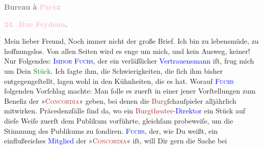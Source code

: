            \pstart
           \begin{otherlanguage}{french}\textcolor{gray}{\textbf{\textbf{Bureau à \textcolor{pink}{Paris}{}\ledrightnote{\textcolor{pink}{Paris}}:}}}\end{otherlanguage}\pend
           \pstart
           \begin{otherlanguage}{french}\textcolor{gray}{\textbf{\textbf{\textcolor{pink}{24. Rue Feydeau}{}\ledrightnote{\textcolor{pink}{rue Feydeau}}.}}}\end{otherlanguage}\pend
           \pstart\center{}Mein lieber Freund,\pend\pstart
           Noch immer nicht der große Brief. Ich bin zu lebensmüde, zu hoffnungslos. Von allen
               Seiten wird es enge um mich, und kein Ausweg, keiner!\pend
           \pstart
           Nur Folgendes: \textsc{\textcolor{blue}{Isidor Fuchs}{}\ledrightnote{\textcolor{blue}{Isidor Fuchs}}}, der ein verläßlicher \textcolor{blue}{Vertrauensmann}{} iſt, frug mich um Dein \textcolor{green}{Stück}{}. Ich ſagte ihm, die Schwierig{\pb}keiten, die ſich ihm bisher entgegengeſtellt, lagen
               wohl in den Kühnheiten, die es hat. Worauf \textsc{\textcolor{blue}{Fuchs}{}\ledrightnote{\textcolor{blue}{Isidor Fuchs}}} ſolgenden Vorſchlag machte: Man ſolle es zuerſt in einer jener Vorſtellungen
               zum Benefiz der »\textsc{\textcolor{brown}{Concordia}{}\ledrightnote{\textcolor{brown}{Concordia}}}« geben, bei denen die \textcolor{brown}{Burg}{}ſchauſpieler alljährlich mitwirken. Präcedenzfälle ſind da, wo ein \textcolor{blue}{\textcolor{brown}{Burgtheater}{}\ledrightnote{\textcolor{brown}{Burgtheater}}-Direktor}{} ein Stück auf dieſe
               Weiſe zuerſt dem Publikum vorführte, {\pb}gleichſam
               probeweiſe, um  die Stimmung des Publikums zu
               ſondiren. \textsc{\textcolor{blue}{Fuchs}{}\ledrightnote{\textcolor{blue}{Isidor Fuchs}}}, der, wie Du weißt, ein einflußreiches \textcolor{blue}{Mitglied}{} der »\textsc{\textcolor{brown}{Concordia}{}\ledrightnote{\textcolor{brown}{Concordia}}}« iſt, will Dir gern die Sache bei \label{K_L02736-3v}\label{K_L02736-3h}
